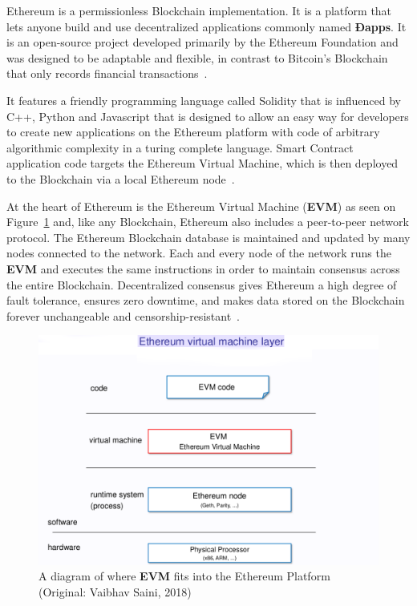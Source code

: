 Ethereum is a permissionless Blockchain implementation. It is a platform that
lets anyone build and use decentralized applications commonly named
\textbf{Ðapps}. It is an open-source project developed primarily by the
Ethereum Foundation and was designed to be adaptable and flexible, in contrast
to Bitcoin's Blockchain that only records financial
transactions~\cite{EthereumDocs2018}.

It features a friendly programming language called Solidity that is influenced
by C++, Python and Javascript that is designed to allow an easy way for
developers to create new applications on the Ethereum platform with code of
arbitrary algorithmic complexity in a turing complete language. Smart Contract
application code targets the Ethereum Virtual Machine, which is then deployed
to the Blockchain via a local Ethereum node~\cite{Wood2017,Barclay2017}.

At the heart of Ethereum is the Ethereum Virtual Machine (\textbf{EVM}) as seen
on Figure~\ref{fig:evm} and, like any Blockchain, Ethereum also includes a
peer-to-peer network protocol. The Ethereum Blockchain database is maintained
and updated by many nodes connected to the network. Each and every node of the
network runs the \textbf{EVM} and executes the same instructions in order to
maintain consensus across the entire Blockchain. Decentralized consensus gives
Ethereum a high degree of fault tolerance, ensures zero downtime, and makes
data stored on the Blockchain forever unchangeable and
censorship-resistant~\cite{EthereumDocs2018}.

\begin{figure}[h]
  \centering
  \includegraphics[width=1\linewidth]{imgs/ethereumVirtualMachine.png}
  \caption{\label{fig:evm} A diagram of where \textbf{EVM} fits into the
  Ethereum Platform (Original: Vaibhav Saini, 2018)}
\end{figure}

